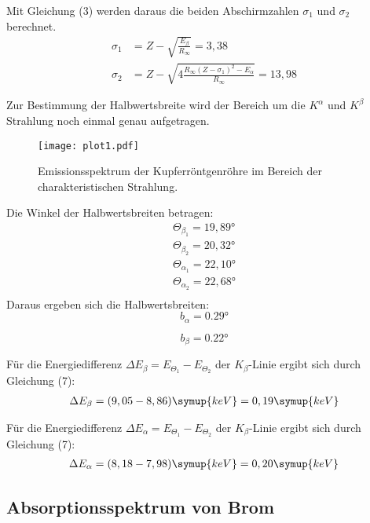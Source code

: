 Mit Gleichung (3) werden daraus die beiden Abschirmzahlen $\sigma_1$ und $\sigma_2$ berechnet.
\begin{align*}
  \sigma_1 &= Z - \sqrt{\frac{E_{\beta}}{R_{\infty}}} = 3,38 \\
  \sigma_2 &= Z - \sqrt{4 \frac{R_{\infty} (Z-\sigma_1)^2 - E_{\alpha}}{R_{\infty}}} = 13,98
\end{align*}

Zur Bestimmung der Halbwertsbreite wird der Bereich um die $K^{\alpha}$ und $K^{\beta}$ Strahlung
noch einmal genau aufgetragen.

\begin{figure}
  \centering
  \texttt{[image: plot1.pdf]}
  \caption{Emissionsspektrum der Kupferröntgenröhre im Bereich der charakteristischen Strahlung.}
  \label{fig:plot1}
\end{figure}

Die Winkel der Halbwertsbreiten betragen:
\begin{align*}
  \Theta_{\beta_1} = 19,89° \\
  \Theta_{\beta_2} = 20,32° \\
  \Theta_{\alpha_1} = 22,10° \\
  \Theta_{\alpha_2} = 22,68° \\
\end{align*}
Daraus ergeben sich die Halbwertsbreiten:
\begin{equation*}
  b_{\alpha} = 0.29°
\end{equation*}

\begin{equation*}
  b_{\beta} = 0.22°
\end{equation*}



Für die Energiedifferenz $\Delta E_{\beta} = E_{\Theta_1} - E_{\Theta_2}$ der $K_{\beta}$-Linie ergibt sich durch Gleichung (7):
\begin{align*}
  \Delta E_{\beta} =  (9,05 - 8,86) \symup{keV} = 0,19 \symup{keV}
\end{align*}

Für die Energiedifferenz $\Delta E_{\alpha} = E_{\Theta_1} - E_{\Theta_2}$ der $K_{\beta}$-Linie ergibt sich durch Gleichung (7):
\begin{align*}
  \Delta E_{\alpha} =  (8,18 - 7,98) \symup{keV} = 0,20 \symup{keV}
\end{align*}

\subsection{Absorptionsspektrum von Brom}

